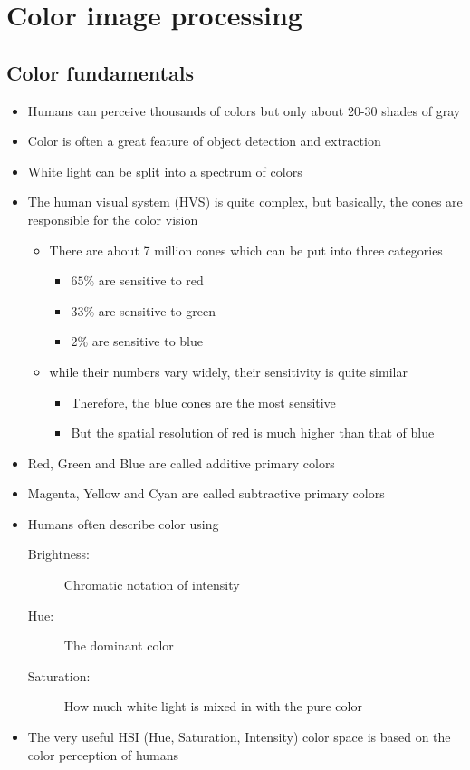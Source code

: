 \newpage
\section{Color image processing }
\subsection{Color fundamentals }
\begin{itemize}
	\item Humans can perceive thousands of colors but only about 20-30 shades of gray
	\item Color is often a great feature of object detection and extraction
	\item White light can be split into a spectrum of colors
	\item The human visual system (HVS) is quite complex, but basically, the cones are responsible for the color vision
	\begin{itemize}
		\item There are about 7 million cones which can be put into three categories
		\begin{itemize}
			\item $65\% $ are sensitive to red
			\item $33\% $ are sensitive to green
			\item $2\% $ are sensitive to blue
		\end{itemize}
		\item while their numbers vary widely, their sensitivity is quite similar
		\begin{itemize}
			\item Therefore, the blue cones are the most sensitive
			\item But the spatial resolution of red is much higher than that of blue
		\end{itemize}
	\end{itemize}
	\item Red, Green and Blue are called additive primary colors
	\item Magenta, Yellow and Cyan are called subtractive primary colors
	\item Humans often describe color using
	\begin{description}
		\item[Brightness:] Chromatic notation of intensity
		\item[Hue:] The dominant color
		\item[Saturation:] How much white light is mixed in with the pure color
	\end{description}
	\item The very useful HSI (Hue, Saturation, Intensity) color space is based on the color perception of humans
\end{itemize}

